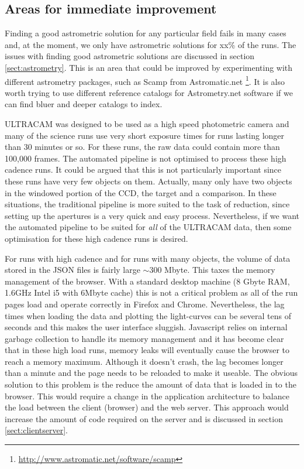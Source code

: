 \subsection{Areas for immediate improvement}
Finding a good astrometric solution for any particular field fails in many cases and, at the moment, we only have astrometric solutions for xx\% of the runs. The issues with finding good astrometric solutions are discussed in section \ref{sect:astrometry}. This is an area that could be improved by experimenting with different astrometry packages, such as Scamp from Astromatic.net \footnote{\url{http://www.astromatic.net/software/scamp}}. It is also worth trying to use different reference catalogs for Astrometry.net software if we can find bluer and deeper catalogs to index. 

ULTRACAM was designed to be used as a high speed photometric camera and many of the science runs use very short exposure times for runs lasting longer than 30 minutes or so. For these runs,  the raw data could contain more than 100,000 frames. The automated pipeline is not optimised to process these high cadence runs. It could be argued that this is not particularly important since these runs have very few objects on them. Actually, many only have two objects in the windowed portion of the CCD, the target and a comparison. In these situations, the traditional pipeline is more suited to the task of reduction, since setting up the apertures is a very quick and easy process. Nevertheless, if we want the automated pipeline to be suited for \emph{all} of the ULTRACAM data, then some optimisation for these high cadence runs is desired. 

For runs with high cadence and for runs with many objects, the volume of data stored in the JSON files is fairly large $\sim 300$ Mbyte. This taxes the memory management of the browser. With a standard desktop machine (8 Gbyte RAM, 1.6GHz Intel i5 with 6Mbyte cache) this is not a critical problem as all of the run pages load and operate correctly in Firefox and Chrome. Nevertheless, the lag times when loading the data and plotting the light-curves can be several tens of seconds and this makes the user interface sluggish. Javascript relies on internal garbage collection to handle its memory management and it has become clear that in these high load runs, memory leaks will eventually cause the browser to reach a memory maximum. Although it doesn't crash, the lag becomes longer than a minute and the page needs to be reloaded to make it useable. The obvious solution to this problem is the reduce the amount of data that is loaded in to the browser. This would require a change in the application architecture to balance the load between the client (browser) and the web server. This approach would increase the amount of code required on the server and is discussed in section \ref{sect:clientserver}.  

